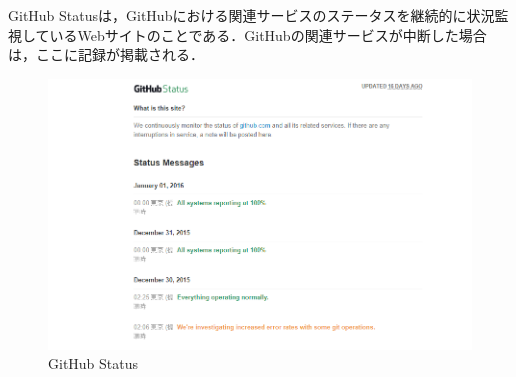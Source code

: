 \newpage
GitHub Statusは，GitHubにおける関連サービスのステータスを継続的に状況監視しているWebサイトのことである．GitHubの関連サービスが中断した場合は，ここに記録が掲載される．

\begin{figure}[htb]
\centering
\includegraphics[width=13cm]{img/status.png}
\caption{GitHub Status}
\end{figure}

\newpage


